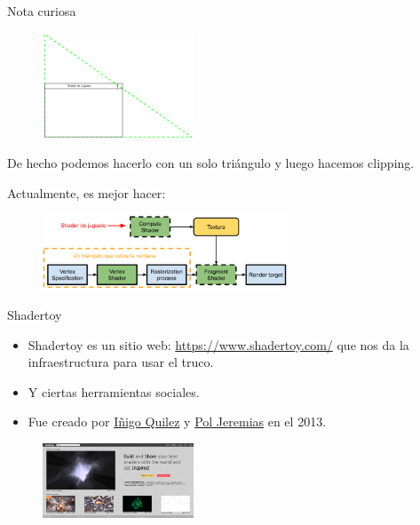 \begin{frame}{Nota curiosa}
\begin{figure}[htp]
  \centering
  \includegraphics[width=0.4\textwidth]{img/onetriangle}
\end{figure}
De hecho podemos hacerlo con un solo triángulo y luego hacemos clipping.
\end{frame}

\begin{frame}{Actualmente, es mejor hacer:}
\begin{figure}[htp]
  \centering
  \includegraphics[width=0.65\textwidth]{img/TrucoModerno}
\end{figure}
\end{frame}

\begin{frame}{Shadertoy}
\begin{itemize}
    \item Shadertoy es un sitio web: \url{https://www.shadertoy.com/} que nos da la infraestructura para usar el truco.
    \item Y ciertas herramientas sociales.
    \item Fue creado por \href{https://iquilezles.org/}{Iñigo Quilez} y \href{https://www.poljeremias.com/}{Pol Jeremias} en el 2013.
\end{itemize}
\begin{figure}[htp]
  \centering
  \includegraphics[width=0.4\textwidth]{img/ShaderToySite}
\end{figure}
\end{frame}

